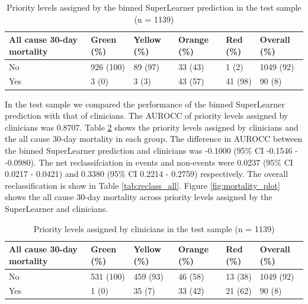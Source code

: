 \documentclass[10pt,letterpaper]{article}\usepackage[]{graphicx}\usepackage[]{color}
\begin{document}
\begin{table}[ht]
\centering
\caption{Priority levels assigned by the binned SuperLearner prediction in the test sample (n = 1139)} 
\label{tab:superlearner_priorities_test}
\begin{tabular}{llllll}
  \hline
All cause 30-day mortality & Green (\%) & Yellow (\%) & Orange (\%) & Red (\%) & Overall (\%) \\ 
  \hline
No & 926 (100) & 89 (97) & 33 (43) & 1 (2) & 1049 (92) \\ 
  Yes & 3 (0) & 3 (3) & 43 (57) & 41 (98) & 90 (8) \\ 
   \hline
\end{tabular}
\end{table}


In the test sample we compared the performance of the binned SuperLearner
prediction with that of clinicians. The AUROCC of priority levels assigned by
clinicians was 0.8707. Table \ref{tab:clinicians_priorities_test}
shows the priority levels assigned by clinicians and the all cause 30-day
mortality in each group. The difference in AUROCC between the binned
SuperLearner prediction and clinicians was
-0.1000 (95\% CI -0.1546 - -0.0980). The net reclassifciation in events and
non-events were 0.0237 (95\% CI 0.0217 - 0.0421) and 0.3380 (95\% CI 0.2214 - 0.2759) respectively. The overall
reclassification is show in Table \ref{tab:reclass_all}. Figure
\ref{fig:mortality_plot} shows the all cause 30-day mortality across priority
levels assigned by the SuperLearner and clinicians.

\begin{table}[ht]
\centering
\caption{Priority levels assigned by clinicians in the test sample (n = 1139)} 
\label{tab:clinicians_priorities_test}
\begin{tabular}{llllll}
  \hline
All cause 30-day mortality & Green (\%) & Yellow (\%) & Orange (\%) & Red (\%) & Overall (\%) \\ 
  \hline
No & 531 (100) & 459 (93) & 46 (58) & 13 (38) & 1049 (92) \\ 
  Yes & 1 (0) & 35 (7) & 33 (42) & 21 (62) & 90 (8) \\ 
   \hline
\end{tabular}
\end{table}
\end{document}
